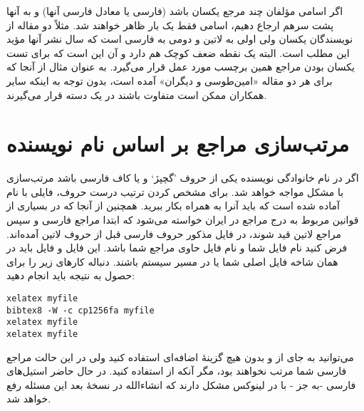 \documentclass{article}
\theoremstyle{plain}\newtheorem{question}{پرسش}
\begin{document}
اگر اسامی مؤلفان چند مرجع یکسان باشد (فارسی یا معادل فارسی آنها) و  به آنها  پشت سرهم ارجاع دهیم، اسامی فقط یک بار ظاهر خواهند شد. مثلاً \citet{Amintoosi09precise,Amintoosi87afzayesh} دو مقاله از نویسندگان یکسان ولی اولی به لاتین و دومی به فارسی است که سال نشر آنها مؤید این مطلب است. 
 البته یک نقطه ضعف کوچک هم دارد و آن این است که برای تست یکسان بودن مراجع همین برچسب مورد عمل قرار می‌گیرد. به عنوان مثال از آنجا که برای هر دو مقاله «امین‌طوسی و دیگران» آمده است، بدون توجه به اینکه سایر همکاران ممکن است متفاوت باشند در یک دسته قرار می‌گیرند.


\section{مرتب‌سازی مراجع بر اساس نام نویسنده}\label{Sec:sorting}
اگر در نام خانوادگی نویسنده‌ یکی از حروف 'گچپژ` و یا کاف فارسی باشد مرتب‌سازی با مشکل مواجه خواهد شد. برای مشخص کردن ترتیب درست حروف، فایلی با نام  آماده شده است که باید آنرا به همراه  بکار ببرید. همچنین از آنجا که در بسیاری از قوانین مربوط به درج مراجع در ایران خواسته می‌شود که ابتدا مراجع فارسی و سپس مراجع لاتین قید شوند، در فایل مذکور حروف فارسی قبل از حروف لاتین آمده‌اند.
فرض کنید نام فایل شما  و نام فایل حاوی مراجع شما  باشد. این فایل و فایل  باید در همان شاخه فایل اصلی شما یا در مسیر سیستم باشند. 
دنباله کارهای زیر را برای حصول به نتیجه باید انجام دهید:
\begin{LTR}
\begin{verbatim}
xelatex myfile
bibtex8 -W -c cp1256fa myfile
xelatex myfile
xelatex myfile
\end{verbatim}
\end{LTR}
می‌توانید به جای  از {}  و بدون هیچ گزینهٔ اضافه‌ای استفاده کنید ولی در این حالت مراجع فارسی شما مرتب نخواهند بود، مگر آنکه از  استفاده کنید. در حال حاضر استیل‌های فارسی -به جز - با  در لینوکس مشکل دارند که انشاءالله در نسخهٔ بعد این مسئله رفع خواهد شد.
\end{document}
